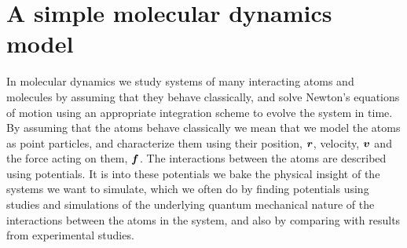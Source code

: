 \chapter{A simple molecular dynamics model\label{chap:simple_md_program}}
In molecular dynamics we study systems of many interacting atoms and molecules by assuming that they behave classically, and solve Newton's equations of motion using an appropriate integration scheme to evolve the system in time. By assuming that the atoms behave classically we mean that we model the atoms as point particles, and characterize them using their position, $\boldsymbol{r}$, velocity, $\boldsymbol{v}$ and the force acting on them, $\boldsymbol{f}$. The interactions between the atoms are described using potentials. It is into these potentials we bake the physical insight of the systems we want to simulate, which we often do by finding potentials using studies and simulations of the underlying quantum mechanical nature of the interactions between the atoms in the system, and also by comparing with results from experimental studies.
